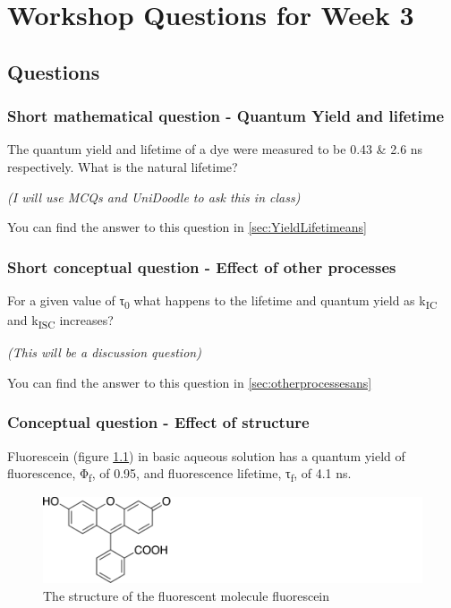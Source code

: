 \documentclass[
]{book}
\begin{document}
\hypertarget{ch:Workshop2}{%
\chapter{Workshop Questions for Week 3}\label{ch:Workshop2}}

\hypertarget{sec:fluorescencequestions}{%
\section{Questions}\label{sec:fluorescencequestions}}

\hypertarget{sec:YieldLifetime}{%
\subsection{Short mathematical question - Quantum Yield and lifetime}\label{sec:YieldLifetime}}

The quantum yield and lifetime of a dye were measured to be 0.43 \& 2.6 ns respectively. What is the natural lifetime?

\emph{(I will use MCQs and UniDoodle to ask this in class)}

You can find the answer to this question in \ref{sec:YieldLifetimeans}

\hypertarget{sec:otherprocesses}{%
\subsection{Short conceptual question - Effect of other processes}\label{sec:otherprocesses}}

For a given value of τ\textsubscript{0} what happens to the lifetime and quantum yield as k\textsubscript{IC} and k\textsubscript{ISC} increases?

\emph{(This will be a discussion question)}

You can find the answer to this question in \ref{sec:otherprocessesans}

\hypertarget{sec:structure}{%
\subsection{Conceptual question - Effect of structure}\label{sec:structure}}

Fluorescein (figure \ref{fig:fluorescein}) in basic aqueous solution has a quantum yield of fluorescence, Φ\textsubscript{f}, of 0.95, and fluorescence lifetime, τ\textsubscript{f}, of 4.1 ns.

\begin{figure}

{\centering \includegraphics[width=0.7\linewidth]{images/fluorescein} 

}

\caption{The structure of the fluorescent molecule fluorescein}\label{fig:fluorescein}
\end{figure}
\end{document}
